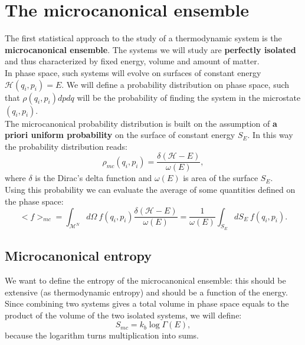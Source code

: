 \section{The microcanonical ensemble}\label{sec:MicroCan}
The first statistical approach to the study of a thermodynamic system is the \textbf{microcanonical ensemble}. The systems we will study are \textbf{perfectly isolated} and thus characterized by fixed energy, volume and amount of matter. \\ In phase space, such systems will evolve on surfaces of constant energy $\mathcal{H} (q_i,p_i)=E$. We will define a probability distribution on phase space, such that $\rho(q_i,p_i)dpdq$ will be the probability of finding the system in the microstate $(q_i,p_i)$.\\

The microcanonical probability distribution is built on the assumption of \textbf{a priori uniform probability} on the surface of constant energy $S_E$. In this way the probability distribution reads:
\begin{equation}
    \label{MicroCanPDF}
    \rho_{mc}(q_i,p_i)=\frac{\delta(\mathcal{H} -E)}{\omega(E)},
\end{equation}
where $\delta$ is the Dirac's delta function and $\omega(E)$ is area of the surface $S_E$.\\
Using this probability we can evaluate the average of some quantities defined on the phase space:
\begin{equation*}
    \big<f\big>_{mc}=\int_{\mathcal{M}^N}d\Omega\ f(q_i,p_i)\frac{\delta(\mathcal{H} -E)}{\omega(E)}=\frac{1}{\omega(E)}\int_{S_E}dS_E\ f(q_i,p_i).
\end{equation*} 
\subsection{Microcanonical entropy}
We want to define the entropy of the microcanonical ensemble: this should be extensive (as thermodynamic entropy) and should be a function of the energy. Since combining two systems gives a total volume in phase space equals to the product of the volume of the two isolated systems, we will define:
\begin{equation}
    S_{mc}=k_b\log\Gamma(E),\label{MicroCanEntr}
\end{equation} 
because the logarithm turns multiplication into sums.\\

